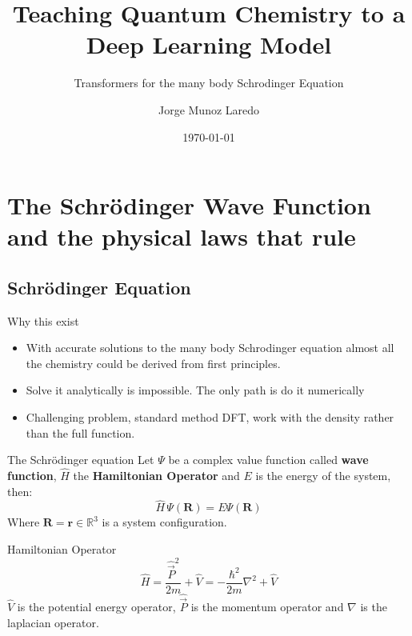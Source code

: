 \documentclass{beamer}
\title{Teaching Quantum Chemistry to a Deep Learning Model }
\subtitle{Transformers for the many body Schrodinger Equation}
\author{Jorge Munoz Laredo}
\date{\today}
\begin{document}
\begin{frame}
    \titlepage
\end{frame}

\section{The Schr\"odinger Wave Function and the physical laws that rule}

\subsection{Schr\"odinger Equation}

\begin{frame}{Why this exist}
\begin{itemize}
    \item With accurate solutions to the many body Schrodinger equation almost all the chemistry could be derived from first principles.
    \item Solve it analytically is impossible. The only path is do it numerically
    \item Challenging problem, standard method DFT, work with the density rather than the full function.
\end{itemize}
\end{frame}

\begin{frame}{The Schr\"odinger equation}
Let $\Psi$ be a complex value function called \textbf{wave function}, $\hat{H}$ the \textbf{Hamiltonian Operator}
and $E$ is the energy of the system, then:
\begin{equation}
\hat{H}\,\Psi(\mathbf{R})=E \Psi(\mathbf{R})
\end{equation}
Where $\mathbf{R}=\mathbf{r}\in\mathbb{R}^{3}$ is a system configuration.

\begin{block}{Hamiltonian Operator}
\begin{equation}
\hat{H}=\frac{\hat{\vec{{P}}}^{2}}{2m}+\hat{V} =-\frac{\hbar^{2}}{2m}\nabla^{2}+\hat{V}
\end{equation}
$\hat{V}$ is the potential energy operator, $\hat{\vec{P}}$ is the momentum operator and $\nabla$ is the laplacian operator.
\end{block}
\end{frame}
\end{document}
